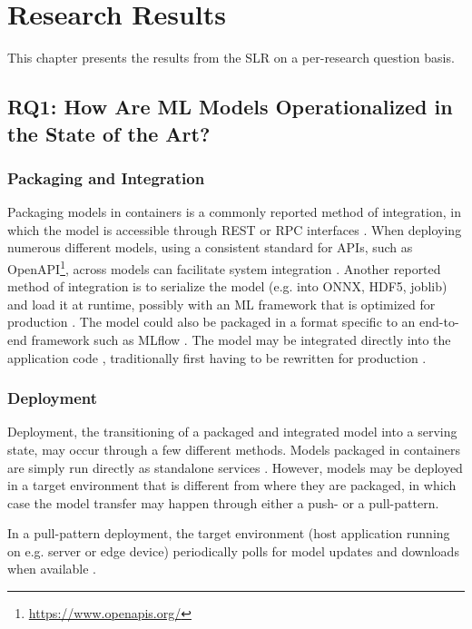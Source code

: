 \chapter{Research Results}
\label{ch:research_results}
This chapter presents the results from the SLR on a per-research question basis.

\section{RQ1: How Are ML Models Operationalized in the State of the Art?}
\label{ch:research_results:rq1_how}
\subsection{Packaging and Integration}
Packaging models in containers is a commonly reported method of integration, in which the model is accessible through REST or RPC interfaces \cite{Garcia2020, Li2017, Ruf2021, Crankshaw2017}.
When deploying numerous different models, using a consistent standard for APIs, such as OpenAPI\footnote{\url{https://www.openapis.org/}}, across models can facilitate system integration \cite{Garcia2020}.
Another reported method of integration is to serialize the model (e.g. into ONNX, HDF5, joblib) and load it at runtime, possibly with an ML framework that is optimized for production \cite{Hazelwood2018, Peticolas2019, Paeaekkoenen2020, Chahal2020}.
The model could also be packaged in a format specific to an end-to-end framework such as MLflow \cite{Chen2020}.
The model may be integrated directly into the application code \cite{Liu2020, Ruf2021, Granlund2021}, traditionally first having to be rewritten for production \cite{Hazelwood2018}.

\subsection{Deployment}
Deployment, the transitioning of a  packaged and integrated model into a serving state, may occur through a few different methods.
Models packaged in containers are simply run directly as standalone services \cite{Liu2020,Ruf2021, Granlund2021, Li2017, Garcia2020}.
However, models may be deployed in a target environment that is different from where they are packaged, in which case the model transfer may happen through either a push- or a pull-pattern.

In a pull-pattern deployment, the target environment (host application running on e.g. server or edge device) periodically polls for model updates and downloads when available \cite{Paeaekkoenen2020, Li2017, Peticolas2019}.


